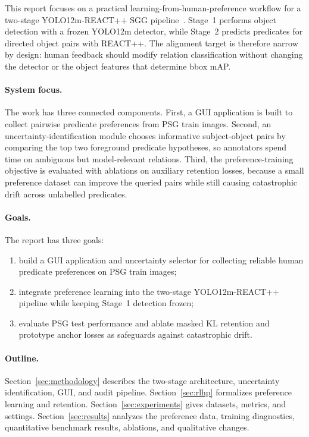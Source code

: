 \documentclass[10pt,twocolumn,letterpaper]{article}
\begin{document}
This report focuses on a practical learning-from-human-preference workflow for a two-stage YOLO12m-REACT++ SGG pipeline~\cite{neau2024reactpp}. Stage~1 performs object detection with a frozen YOLO12m detector, while Stage~2 predicts predicates for directed object pairs with REACT++. The alignment target is therefore narrow by design: human feedback should modify relation classification without changing the detector or the object features that determine bbox mAP.

\paragraph{System focus.}
The work has three connected components. First, a GUI application is built to collect pairwise predicate preferences from PSG train images. Second, an uncertainty-identification module chooses informative subject-object pairs by comparing the top two foreground predicate hypotheses, so annotators spend time on ambiguous but model-relevant relations. Third, the preference-training objective is evaluated with ablations on auxiliary retention losses, because a small preference dataset can improve the queried pairs while still causing catastrophic drift across unlabelled predicates.

\paragraph{Goals.}
The report has three goals:
\begin{enumerate}
    \item build a GUI application and uncertainty selector for collecting reliable human predicate preferences on PSG train images;
    \item integrate preference learning into the two-stage YOLO12m-REACT++ pipeline while keeping Stage~1 detection frozen;
    \item evaluate PSG test performance and ablate masked KL retention and prototype anchor losses as safeguards against catastrophic drift.
\end{enumerate}

\paragraph{Outline.}
Section~\ref{sec:methodology} describes the two-stage architecture, uncertainty identification, GUI, and audit pipeline. Section~\ref{sec:rlhp} formalizes preference learning and retention. Section~\ref{sec:experiments} gives datasets, metrics, and settings. Section~\ref{sec:results} analyzes the preference data, training diagnostics, quantitative benchmark results, ablations, and qualitative changes.
\end{document}
